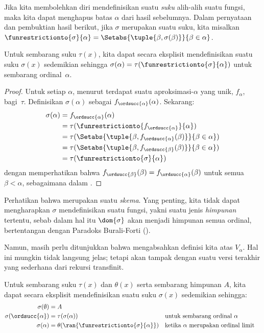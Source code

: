 \documentclass[../../../include/open-logic-section]{subfiles}
\begin{document}
Jika kita membolehkan diri mendefinisikan suatu \emph{suku} alih-alih suatu
fungsi, maka kita dapat menghapus batas $\alpha$ dari hasil sebelumnya.
Dalam pernyataan dan pembuktian hasil berikut, jika $\sigma$ merupakan suatu
suku, kita misalkan $\funrestrictionto{\sigma}{\alpha} =
\Setabs{\tuple{\beta, \sigma(\beta)}}{\beta \in \alpha}$.

\begin{thm}
Untuk sembarang suku $\tau(x)$, kita dapat secara eksplisit mendefinisikan
suatu suku $\sigma(x)$ sedemikian sehingga $\sigma(\alpha) =
\tau(\funrestrictionto{\sigma}{\alpha})$ untuk sembarang ordinal~$\alpha$.
\end{thm}

\begin{proof}
Untuk setiap $\alpha$, menurut  terdapat suatu
aproksimasi-$\alpha$ yang unik, $f_\alpha$, bagi~$\tau$. Definisikan
$\sigma(\alpha)$ sebagai $f_{\ordsucc{\alpha}}(\alpha)$. Sekarang:
	\begin{align*}
		\sigma(\alpha) &=
		f_{\ordsucc{\alpha}}(\alpha) \\&=
		\tau(\funrestrictionto{f_{\ordsucc{\alpha}}}{\alpha}) \\&=
		\tau(\Setabs{\tuple{\beta, f_{\ordsucc{\alpha}}(\beta)}}{\beta \in \alpha}) \\&=
		\tau(\Setabs{\tuple{\beta, f_{\ordsucc{\beta}}(\beta)}}{\beta \in \alpha})\\&=
		\tau(\funrestrictionto{\sigma}{\alpha})
	\end{align*}
dengan memperhatikan bahwa $f_{\ordsucc{\beta}}(\beta) =
f_{\ordsucc{\alpha}}(\beta)$ untuk semua $\beta < \alpha$, sebagaimana
dalam .
\end{proof}
\noindent
Perhatikan bahwa  merupakan suatu \emph{skema}.
Yang penting, kita tidak dapat mengharapkan $\sigma$ mendefinisikan suatu
fungsi, yakni suatu jenis \emph{himpunan} tertentu, sebab dalam hal itu
$\dom{\sigma}$ akan menjadi himpunan semua ordinal, bertentangan dengan
Paradoks Burali-Forti ().

Namun, masih perlu ditunjukkan bahwa 
mengabsahkan definisi kita atas $V_\alpha$. Hal ini mungkin tidak langsung
jelas; tetapi akan tampak dengan suatu versi terakhir yang sederhana dari
rekursi transfinit.

\begin{thm}
Untuk sembarang suku $\tau(x)$ dan $\theta(x)$ serta sembarang himpunan $A$,
kita dapat secara eksplisit mendefinisikan suatu suku $\sigma(x)$ sedemikian
sehingga:
\begin{align*}
	\sigma(\emptyset) &= A\\
	\sigma(\ordsucc{\alpha}) &= \tau(\sigma(\alpha)) &&
		\text{untuk sembarang ordinal }\alpha\\
	\sigma(\alpha) &= \theta(\ran{\funrestrictionto{\sigma}{\alpha}})&&
	\text{ketika }\alpha\text{ merupakan ordinal limit}
\end{align*}
\end{thm}
\end{document}

